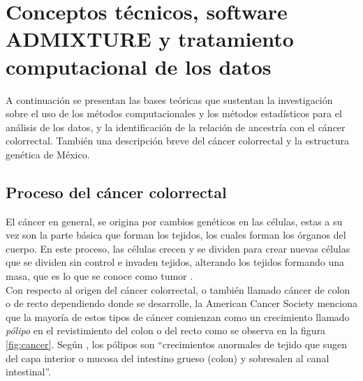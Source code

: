 

\chapter{Conceptos t\'ecnicos, software ADMIXTURE y tratamiento computacional de los datos}



A continuación se presentan las bases teóricas que sustentan la investigación sobre el uso de los métodos computacionales y los métodos estadísticos para el análisis de los datos, y la identificación de la relación de ancestría con el cáncer colorrectal. También una descripci\'on breve del c\'ancer colorrectal y la estructura gen\'etica de M\'exico.\\

\section{Proceso del c\'ancer colorrectal}

El c\'ancer en general, se origina por cambios gen\'eticos en las c\'elulas, estas a su vez son la parte b\'asica que forman los tejidos, los cuales forman los \'organos del cuerpo. En este proceso, las c\'elulas crecen y se dividen para crear nuevas c\'elulas que se dividen sin control e invaden tejidos, alterando los tejidos formando una masa, que es lo que se conoce como tumor \cite{NCI}.\\

Con respecto al origen del c\'ancer colorrectal, o tambi\'en llamado c\'ancer de colon o de recto dependiendo donde se desarrolle, la American Cancer Society \cite{ACS} menciona que la mayor\'ia de estos tipos de c\'ancer comienzan como un crecimiento llamado \textit{p\'olipo} en el revistimiento del colon o del recto como se observa en la figura \ref{fig:cancer}. Seg\'un \cite{ASCRS}, los p\'olipos son ``crecimientos anormales de tejido que sugen del capa interior o mucosa del intestino grueso (colon) y sobresalen al canal intestinal''. 


